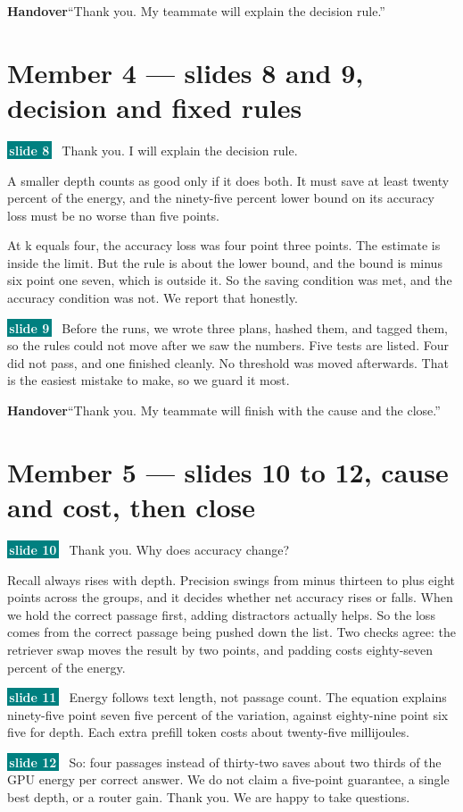 \documentclass[11pt,a4paper]{article}
\newcommand{\slideref}[1]{%
  \colorbox{teal}{\textcolor{white}{\footnotesize\bfseries\,#1\,}}\ }
\newcommand{\handover}[1]{%
  \begin{handbox}%
  {\color{amber}\bfseries Handover}\enspace #1%
  \end{handbox}}
\begin{document}
\handover{``Thank you. My teammate will explain the decision rule.''}

\section{Member 4 \textnormal{\small --- slides 8 and 9, decision and fixed rules}}

\begin{scriptbox}
\slideref{slide 8} Thank you. I will explain the decision rule.

A smaller depth counts as good only if it does both. It must save at least twenty percent of the energy, and the ninety-five percent lower bound on its accuracy loss must be no worse than five points.

At k equals four, the accuracy loss was four point three points. The estimate is inside the limit. But the rule is about the lower bound, and the bound is minus six point one seven, which is outside it. So the saving condition was met, and the accuracy condition was not. We report that honestly.

\slideref{slide 9} Before the runs, we wrote three plans, hashed them, and tagged them, so the rules could not move after we saw the numbers. Five tests are listed. Four did not pass, and one finished cleanly. No threshold was moved afterwards. That is the easiest mistake to make, so we guard it most.
\end{scriptbox}

\handover{``Thank you. My teammate will finish with the cause and the close.''}

\section{Member 5 \textnormal{\small --- slides 10 to 12, cause and cost, then close}}

\begin{scriptbox}
\slideref{slide 10} Thank you. Why does accuracy change?

Recall always rises with depth. Precision swings from minus thirteen to plus eight points across the groups, and it decides whether net accuracy rises or falls. When we hold the correct passage first, adding distractors actually helps. So the loss comes from the correct passage being pushed down the list. Two checks agree: the retriever swap moves the result by two points, and padding costs eighty-seven percent of the energy.

\slideref{slide 11} Energy follows text length, not passage count. The equation explains ninety-five point seven five percent of the variation, against eighty-nine point six five for depth. Each extra prefill token costs about twenty-five millijoules.

\slideref{slide 12} So: four passages instead of thirty-two saves about two thirds of the GPU energy per correct answer. We do not claim a five-point guarantee, a single best depth, or a router gain. Thank you. We are happy to take questions.
\end{scriptbox}
\end{document}
